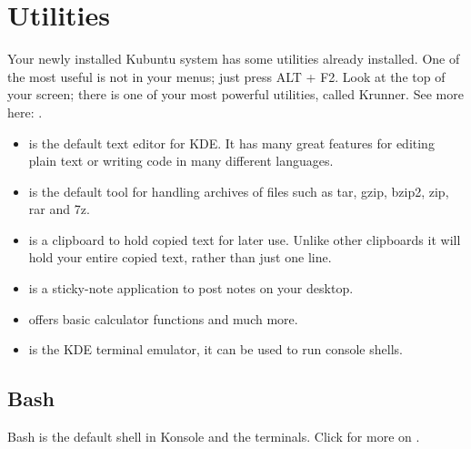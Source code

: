 \documentclass[letterpaper,10pt,english]{sphinxmanual}
\begin{document}
\section{Utilities}
\label{\detokenize{docs/software:utilities}}
Your newly installed Kubuntu system has some utilities already installed. One of the most useful is not in your menus; just press ALT + F2. Look at the top of your screen; there is one of your most powerful utilities, called Krunner. See more here: .
\begin{itemize}
\item {} 
 is the default text editor for KDE. It has many great features for editing plain text or writing code in many different languages.

\item {} 
 is the default tool for handling archives of files such as tar, gzip, bzip2, zip, rar and 7z.

\item {} 
 is a clipboard to hold copied text for later use. Unlike other clipboards it will hold your entire copied text, rather than just one line.

\item {} 
 is a sticky-note application to post notes on your desktop.

\item {} 
 offers basic calculator functions and much more.

\item {} 
 is the KDE terminal emulator, it can be used to run console shells.

\end{itemize}


\subsection{Bash}
\label{\detokenize{docs/software:bash}}
Bash is the default shell in Konsole and the terminals. Click for more on .
\end{document}
